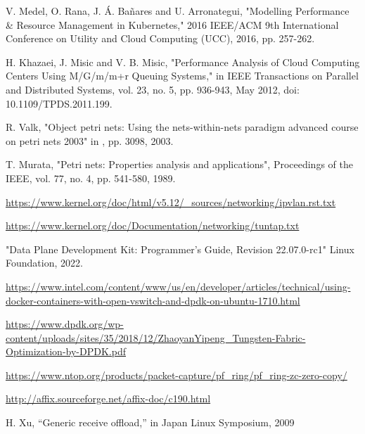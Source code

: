 \documentclass[conference]{IEEEtran}
\begin{document}
\begin{thebibliography}{1}
V. Medel, O. Rana, J. Á. Bañares and U. Arronategui, "Modelling Performance \& Resource Management in Kubernetes," 2016 IEEE/ACM 9th International Conference on Utility and Cloud Computing (UCC), 2016, pp. 257-262.

H. Khazaei, J. Misic and V. B. Misic, "Performance Analysis of Cloud Computing Centers Using M/G/m/m+r Queuing Systems," in IEEE Transactions on Parallel and Distributed Systems, vol. 23, no. 5, pp. 936-943, May 2012, doi: 10.1109/TPDS.2011.199.

R. Valk, "Object petri nets: Using the nets-within-nets paradigm advanced course on petri nets 2003" in , pp. 3098, 2003.

T. Murata, "Petri nets: Properties analysis and applications", Proceedings of the IEEE, vol. 77, no. 4, pp. 541-580, 1989.

\url{https://www.kernel.org/doc/html/v5.12/_sources/networking/ipvlan.rst.txt}

\url{https://www.kernel.org/doc/Documentation/networking/tuntap.txt}

"Data Plane Development Kit: Programmer's Guide, Revision 22.07.0-rc1" Linux Foundation, 2022.

\url{https://www.intel.com/content/www/us/en/developer/articles/technical/using-docker-containers-with-open-vswitch-and-dpdk-on-ubuntu-1710.html}

\url{https://www.dpdk.org/wp-content/uploads/sites/35/2018/12/ZhaoyanYipeng_Tungsten-Fabric-Optimization-by-DPDK.pdf}

\url{https://www.ntop.org/products/packet-capture/pf_ring/pf_ring-zc-zero-copy/}

\url{http://affix.sourceforge.net/affix-doc/c190.html}

H. Xu, “Generic receive offload,” in Japan Linux Symposium, 2009

\end{thebibliography}

\end{document}
